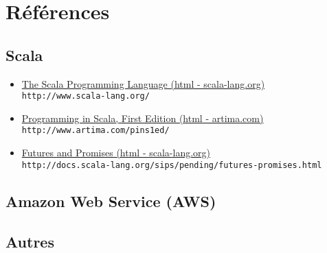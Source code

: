 \appendix

\chapter{Références}

\section{Scala}

\begin{itemize}

\item \href{http://www.scala-lang.org/}{The Scala Programming Language (html - scala-lang.org)}\\
\verb?http://www.scala-lang.org/?\\

\item \href{http://www.artima.com/pins1ed/}{Programming in Scala, First Edition
(html - artima.com)}\\
\verb?http://www.artima.com/pins1ed/?\\

\item \href{http://docs.scala-lang.org/sips/pending/futures-promises.html}{Futures
and Promises (html - scala-lang.org)}\\
\verb?http://docs.scala-lang.org/sips/pending/futures-promises.html?\\

\end{itemize}

\section{Amazon Web Service (AWS)}

\section{Autres}

